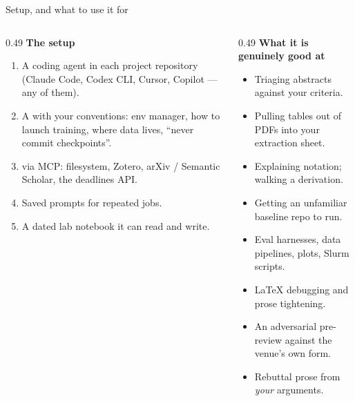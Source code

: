 \documentclass[aspectratio=169,11pt]{beamer}
\begin{document}
\begin{frame}{Setup, and what to use it for}
\begin{columns}[T]
\begin{column}{0.49\textwidth}
\textbf{The setup}
\footnotesize
\begin{enumerate}
  \item A coding agent in each project repository (Claude Code, Codex CLI,
        Cursor, Copilot --- any of them).
  \item A  with your conventions: env manager, how to
        launch training, where data lives, ``never commit checkpoints''.
  \item {} via MCP: filesystem, Zotero, arXiv /
        Semantic Scholar, the deadlines API.
  \item Saved prompts for repeated jobs.
  \item A dated  lab notebook it can read and write.
\end{enumerate}
\end{column}
\begin{column}{0.49\textwidth}
\textbf{What it is genuinely good at}
\footnotesize
\begin{itemize}
  \item Triaging abstracts against your criteria.
  \item Pulling tables out of PDFs into your extraction sheet.
  \item Explaining notation; walking a derivation.
  \item Getting an unfamiliar baseline repo to run.
  \item Eval harnesses, data pipelines, plots, Slurm scripts.
  \item LaTeX debugging and prose tightening.
  \item An adversarial pre-review against the venue's own form.
  \item Rebuttal prose from \emph{your} arguments.
\end{itemize}
\end{column}
\end{columns}
\end{frame}
\end{document}
